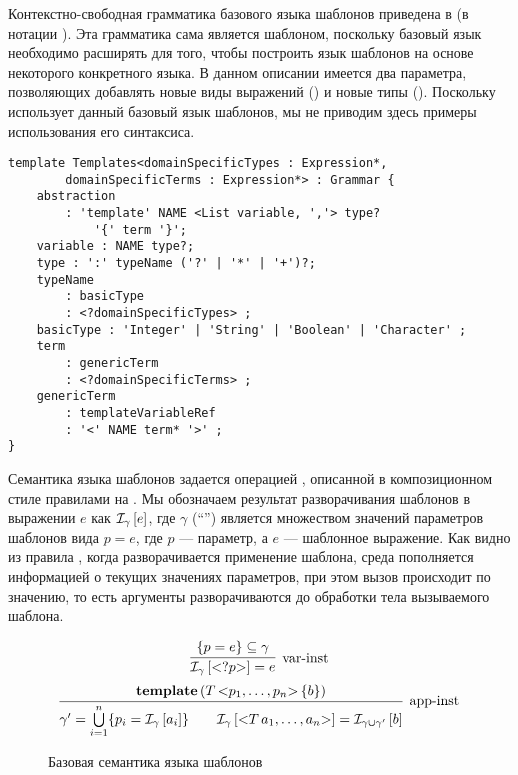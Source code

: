 Контекстно-свободная грамматика базового языка шаблонов приведена в  (в нотации \GRM{}). Эта грамматика сама является шаблоном, поскольку базовый язык необходимо расширять для того, чтобы построить язык шаблонов на основе некоторого конкретного языка. В данном описании имеется два параметра, позволяющих добавлять новые виды выражений () и новые типы (). Поскольку \GRM{} использует данный базовый язык шаблонов, мы не приводим здесь примеры использования его синтаксиса.

\begin{lstlisting}[label=TempG,float=htbp,caption=Базовый синтаксис языка шаблонов]
template Templates<domainSpecificTypes : Expression*, 
		domainSpecificTerms : Expression*> : Grammar {
	abstraction 
		: 'template' NAME <List variable, ','> type? 
			'{' term '}';
	variable : NAME type?;
	type : ':' typeName ('?' | '*' | '+')?;
	typeName
		: basicType
		: <?domainSpecificTypes> ;
	basicType : 'Integer' | 'String' | 'Boolean' | 'Character' ;
	term
		: genericTerm
		: <?domainSpecificTerms> ;
	genericTerm
		: templateVariableRef
		: '<' NAME term* '>' ;
}
\end{lstlisting}

Семантика языка шаблонов задается операцией , описанной в композиционном стиле правилами на . Мы обозначаем результат разворачивания шаблонов в выражении $e$ как $\mathcal{I}_{\gamma} \left[ e \right]$, где $\gamma$ (``'') является множеством значений параметров шаблонов вида $p = e$, где $p$ --- параметр, а $e$ --- шаблонное выражение. Как видно из правила , когда разворачивается применение шаблона, среда пополняется информацией о текущих значениях параметров, при этом вызов происходит по значению, то есть аргументы разворачиваются до обработки тела вызываемого шаблона. 

\begin{figure}[htbp]
	\centering
$$
\trule{
	\{p = e\} \subseteq \gamma
}{
	\Inst{\gamma}{\ang{?p}} = e
}{var-inst}
$$ 
$$
\trule{
	\mathbf{template}\left(
		T \, \ang{p_1, \ldots, p_n} \, \{ b \}
	\right)
}{
	\gamma' = \bigcup\limits_{i=1}^{n} \{ p_i = \Inst{\gamma}{a_i} \}
	\qquad
	\Inst{\gamma}{\ang{T \, a_1, \ldots, a_n}} = \Inst{\gamma \cup \gamma'}{b}
}{app-inst}
$$
	\caption{Базовая семантика языка шаблонов}\label{TempSem}
\end{figure}



